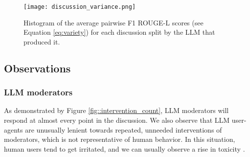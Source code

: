 \begin{figure}
	\centering
	\texttt{[image: discussion\_variance.png]}
	\caption{Histogram of the average pairwise F1 ROUGE-L scores (see Equation \ref{eq:variety}) for each discussion split by the \ac{LLM} that produced it.}
	\label{fig::discussion_variance}
\end{figure}


\subsection{Observations}

\subsubsection{LLM moderators}

As demonstrated by Figure \ref{fig::intervention_count}, \ac{LLM} moderators will respond at almost every point in the discussion. We also observe that \ac{LLM} user-agents are unusually lenient towards repeated, unneeded interventions of moderators, which is not representative of human behavior. In this situation, human users tend to get irritated, and we can usually observe a rise in toxicity \cite{schaffner_community_guidelines, make_reddit_great, proactive_moderation, cresci_pesonalized_interventions}.

